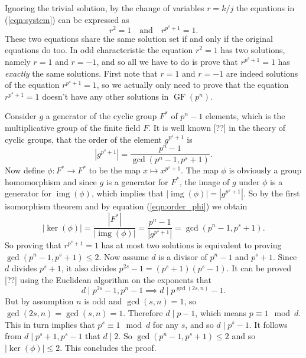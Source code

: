\documentclass[a4paper, 11pt]{article}
\DeclareMathOperator{\GF}{GF}
\DeclareMathOperator{\im}{img}
\begin{document}
  Ignoring the trivial solution, by the change of variables
  $r = k / j$ the equations in (\ref{eqn:system}) can be
  expressed as
  \begin{equation}
    r^2 = 1
    \quad
    \text{and}
    \quad
    r^{p^{s}+1} = 1.
  \end{equation} 
  These two equations share the same solution set if and
  only if the original equations do too. In odd
  characteristic the equation $r^2 = 1$ has two solutions,
  namely $r = 1$ and $r = -1$, and so all we have to do is
  prove that $r^{p^{s}+1} = 1$ has \textit{exactly} the same
  solutions.  First note that $r = 1$ and $r = -1$ are
  indeed solutions of the equation $r^{p^{s}+1} = 1$, so we
  actually only need to prove that the equation $r^{p^{s}+1}
  = 1$ doesn't have any other solutions in $\GF(p^{n})$. 

  Consider $g$ a generator of the cyclic group $F^{*}$ of
  $p^{n}-1$ elements, which is the multiplicative group of
  the finite field $F$. It is well known [??] in the theory
  of cyclic groups, that the order of the element
  $g^{p^{s}+1}$ is
  \begin{equation}
    \label{eqn:order_phi}
    \left|g^{p^{s}+1}\right|
    = \frac{p^{n}-1}{\gcd\left( p^{n}-1, p^{s}+1 \right) }.
  \end{equation} 
  Now define $\phi : F^{*} \to F^{*}$ to be the map $x
  \mapsto x^{p^{s}+1}$.  The map $\phi$ is obviously a group
  homomorphism and since $g$ is a generator for $F^{*}$, the
  image of $g$ under $\phi$ is a generator for $\im(\phi)$,
  which implies that $|\im(\phi)| =
  \left|g^{p^{s}+1}\right|$. So by the first isomorphism
  theorem and by equation (\ref{eqn:order_phi}) we obtain
  \begin{equation}
    |\ker(\phi)|
    = \frac{|F^{*}|}{|\im(\phi)|}
    = \frac{p^{n}-1}{\left|g^{p^{s}+1}\right|}
    = \gcd(p^{n}-1, p^{s}+1).
  \end{equation}
  So proving that $r^{p^{s}+1}=1$ has at most two solutions
  is equivalent to proving $\gcd(p^{n}-1, p^{s}+1) \leq 2$.
  Now assume $d$ is a divisor of $p^{n}-1$ and $p^{s}+1$.
  Since $d$ divides $p^{s}+1$, it also divides $p^{2s}-1 =
  \left( p^{s}+1\right) \left( p^{s}-1 \right)$. It can be
  proved [??] using the Euclidean algorithm on the exponents
  that 
  \[
    d \mid p^{2s}-1, p^{n}-1
    \implies
    d \mid p^{\gcd(2s, n)} - 1.
  \] 
  But by assumption $n$ is odd and $\gcd(s,n) = 1$, so
  $\gcd(2s, n) = \gcd(s, n) = 1$. Therefore $d \mid p - 1$,
  which means $p \equiv 1 \mod d$. This in turn implies that
  $p^{s} \equiv 1 \mod d$ for any $s$, and so $d \mid p^{s}
  - 1$. It follows from $d \mid p^{s} + 1, p^{s} - 1$ that
  $d \mid 2$. So $\gcd(p^{n}-1, p^{s}+1) \leq 2$ and so
  $|\ker(\phi)| \leq 2$. This concludes the proof. 
\end{document}
